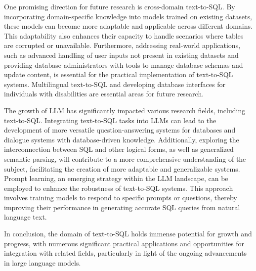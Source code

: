 One promising direction for future research is cross-domain text-to-SQL. By incorporating domain-specific knowledge into models trained on existing datasets, these models can become more adaptable and applicable across different domains. This adaptability also enhances their capacity to handle scenarios where tables are corrupted or unavailable. Furthermore, addressing real-world applications, such as advanced handling of user inputs not present in existing datasets and providing database administrators with tools to manage database schemas and update content, is essential for the practical implementation of text-to-SQL systems. Multilingual text-to-SQL and developing database interfaces for individuals with disabilities are essential areas for future research.

The growth of \ac{LLM} has significantly impacted various research fields, including text-to-SQL. Integrating text-to-SQL tasks into LLMs can lead to the development of more versatile question-answering systems for databases and dialogue systems with database-driven knowledge. Additionally, exploring the interconnection between SQL and other logical forms, as well as generalized semantic parsing, will contribute to a more comprehensive understanding of the subject, facilitating the creation of more adaptable and generalizable systems.
Prompt learning, an emerging strategy within the LLM landscape, can be employed to enhance the robustness of text-to-SQL systems. This approach involves training models to respond to specific prompts or questions, thereby improving their performance in generating accurate SQL queries from natural language text. 

In conclusion, the domain of text-to-SQL holds immense potential for growth and progress, with numerous significant practical applications and opportunities for integration with related fields, particularly in light of the ongoing advancements in large language models.
